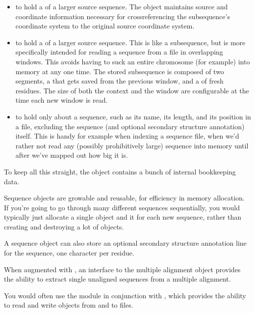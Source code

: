 \begin{itemize}
\item to hold a  of a larger source sequence. The
  object maintains source and coordinate information necessary for
  crossreferencing the subsequence's coordinate system to the original
  source coordinate system.

\item to hold a  of a larger source sequence. This is
  like a subsequence, but is more specifically intended for reading a
  sequence from a file in overlapping windows. This avoids having to
  suck an entire chromosome (for example) into memory at any one
  time. The stored subsequence is composed of two segments, a
   that gets saved from the previous window,
  and a  of fresh residues. The size of both the
  context and the window are configurable at the time each new window
  is read.

\item to hold only  about a sequence, such as its
  name, its length, and its position in a file, excluding the sequence
  (and optional secondary structure annotation) itself. This is handy
  for example when indexing a sequence file, when we'd rather not read
  any (possibly prohibitively large) sequence into memory until after
  we've mapped out how big it is.
\end{itemize}

To keep all this straight, the object contains a bunch of internal
bookkeeping data.

Sequence objects are growable and reusable, for efficiency in memory
allocation. If you're going to go through many different sequences
sequentially, you would typically just allocate a single
 object and  it for each new
sequence, rather than creating and destroying a lot of objects.

A sequence object can also store an optional secondary structure
annotation line for the sequence, one character per residue.

When augmented with , an interface to the 
multiple alignment object provides the ability to extract single
unaligned sequences from a multiple alignment.

You would often use the  module in conjunction with
, which provides the ability to read and write
 objects from and to files.

